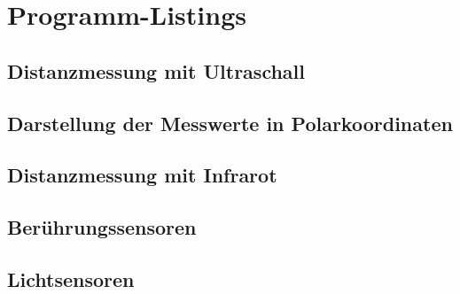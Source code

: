 \chapter{Programm-Listings}\label{ch:robotik-programme}

\begingroup
\lstset{
    language=C++,
    columns=fullflexible,
    keepspaces=true,
    breaklines=true,
    showspaces=false,
    showstringspaces=false,
    showtabs=false,
    tabsize=2,
    numbers=none,
    basicstyle=\ttfamily\footnotesize
}

\section{Distanzmessung mit Ultraschall}







\section{Darstellung der Messwerte in Polarkoordinaten}



\section{Distanzmessung mit Infrarot}



\section{Berührungssensoren}



\section{Lichtsensoren}



\endgroup
